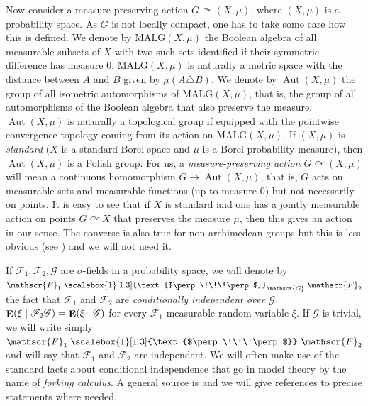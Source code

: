 \documentclass[JEP,XML,SOM,Unicode,published]{cedram}
\let\mathcal\mathscr
\let\actson\curvearrowright
\let\sdiff\triangle
\theoremstyle{plain}
\theoremstyle{definition}
\newcommand{\cF}{\mathcal{F}}
\newcommand{\cG}{\mathcal{G}}
\DeclareMathOperator{\Aut}{Aut}
\DeclareMathOperator{\E}{\mathbf{E}}
\newcommand{\MALG}{\mathrm{MALG}}
\newcommand{\indep}[1][]{%
  \mathrel{
    \mathop{
      \scalebox{1}[1.3]{\text{$\perp\!\!\!\perp$}}
    }\displaylimits_{#1}
  }
}
\begin{document}
Now consider a measure-preserving action $G \actson (X, \mu)$, where $(X, \mu)$ is a probability space. As $G$ is not locally compact, one has to take some care how this is defined. We denote by $\MALG(X, \mu)$ the Boolean algebra of all measurable subsets of $X$ with two such sets identified if their symmetric difference has measure $0$. $\MALG(X, \mu)$ is naturally a metric space with the distance between $A$ and $B$ given by $\mu(A \sdiff B)$. We denote by $\Aut(X, \mu)$ the group of all isometric automorphisms of $\MALG(X, \mu)$, that is, the group of all automorphisms of the Boolean algebra that also preserve the measure. $\Aut(X, \mu)$ is naturally a topological group if equipped with the pointwise convergence topology coming from its action on $\MALG(X, \mu)$. If $(X, \mu)$ is \emph{standard} (\ie $X$ is a standard Borel space and $\mu$ is a Borel probability measure), then $\Aut(X, \mu)$ is a Polish group. For us, a \emph{measure-preserving action $G \actson (X, \mu)$} will mean a continuous homomorphism $G \to \Aut(X, \mu)$, that is, $G$ acts on measurable sets and measurable functions (up to measure $0$) but not necessarily on points. It is easy to see that if $X$ is standard and one has a jointly measurable action on points $G \actson X$ that preserves the measure $\mu$, then this gives an action in our sense. The converse is also true for non-archimedean groups but this is less obvious (see \cite[Th.\,2.3]{Glasner2005a}) and we will not need it.

If $\cF_1, \cF_2, \cG$ are $\sigma$-fields in a probability space, we will denote by $\cF_1 \indep[\cG] \cF_2$ the fact that $\cF_1$ and $\cF_2$ are \emph{conditionally independent over $\cG$}, \ie $\E(\xi \mid \cF_2\cG) = \E(\xi \mid\nobreak \cG)$ for every $\cF_1$-measurable random variable $\xi$. If $\cG$ is trivial, we will write simply $\cF_1 \indep \cF_2$ and will say that $\cF_1$ and $\cF_2$ are independent. We will often make use of the standard facts about conditional independence that go in model theory by the name of \emph{forking calculus}. A general source is \cite[Chap.\,5]{Kallenberg2002} and we will give references to precise statements where needed.
\end{document}
